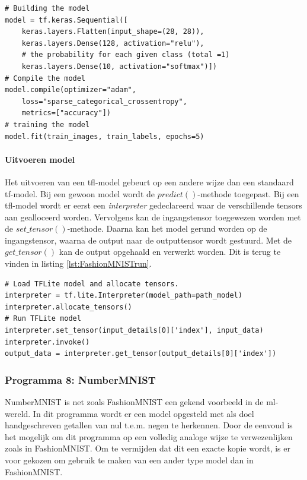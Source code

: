 \begin{lstlisting}[caption={Cre\"eren en trainen van sequentieel model voor FashionMNIST.}, captionpos=b,label={lst:FashionMNISTtrain}]
# Building the model
model = tf.keras.Sequential([
	keras.layers.Flatten(input_shape=(28, 28)),
	keras.layers.Dense(128, activation="relu"),
	# the probability for each given class (total =1)
	keras.layers.Dense(10, activation="softmax")]) 
# Compile the model
model.compile(optimizer="adam",
	loss="sparse_categorical_crossentropy",
	metrics=["accuracy"])
# training the model
model.fit(train_images, train_labels, epochs=5)
	\end{lstlisting}			
						
						
			\newpage
						
			\paragraph{Uitvoeren model}
			Het uitvoeren van een \gls{tfl}-model gebeurt op een andere wijze dan een standaard \gls{tf}-model. Bij een gewoon model wordt de $predict()$-methode toegepast. Bij een \gls{tfl}-model wordt er eerst een \textit{interpreter} gedeclareerd waar de verschillende tensors aan gealloceerd worden. Vervolgens kan de ingangstensor toegewezen worden met de $set\_tensor()$-methode. Daarna kan het model gerund worden op de ingangstensor, waarna de output naar de outputtensor wordt gestuurd. Met de $get\_tensor()$ kan de output opgehaald en verwerkt worden. Dit is terug te vinden in listing \ref{lst:FashionMNISTrun}.
	
	\begin{lstlisting}[caption={Runnen van sequentieel model voor FashionMNIST.}, captionpos=b,label={lst:FashionMNISTrun}]
# Load TFLite model and allocate tensors.
interpreter = tf.lite.Interpreter(model_path=path_model)
interpreter.allocate_tensors()
# Run TFLite model
interpreter.set_tensor(input_details[0]['index'], input_data)
interpreter.invoke()
output_data = interpreter.get_tensor(output_details[0]['index'])
	\end{lstlisting}				

			\subsubsection{Programma 8: NumberMNIST}
				NumberMNIST is net zoals FashionMNIST een gekend voorbeeld in de \gls{ml}-wereld. In dit programma wordt er een model opgesteld met als doel handgeschreven getallen van nul t.e.m. negen te herkennen. Door de eenvoud is het mogelijk om dit programma op een volledig analoge wijze te verwezenlijken zoals in FashionMNIST. Om te vermijden dat dit een exacte kopie wordt, is er voor gekozen om gebruik te maken van een ander type model dan in FashionMNIST.
					
